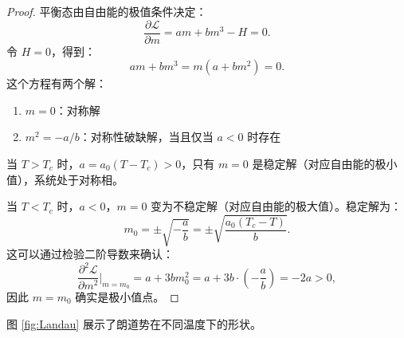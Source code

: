 \begin{proof}
平衡态由自由能的极值条件决定：
\begin{equation}
    \frac{\partial \mathcal{L}}{\partial m} = a m + b m^3 - H = 0.
\end{equation}
令 $H = 0$，得到：
\begin{equation}
    a m + b m^3 = m(a + b m^2) = 0.
\end{equation}
这个方程有两个解：
\begin{enumerate}
    \item $m = 0$：对称解
    \item $m^2 = -a/b$：对称性破缺解，当且仅当 $a < 0$ 时存在
\end{enumerate}

当 $T > T_c$ 时，$a = a_0(T - T_c) > 0$，只有 $m = 0$ 是稳定解（对应自由能的极小值），系统处于对称相。

当 $T < T_c$ 时，$a < 0$，$m = 0$ 变为不稳定解（对应自由能的极大值）。稳定解为：
\begin{equation}
    m_0 = \pm \sqrt{-\frac{a}{b}} = \pm \sqrt{\frac{a_0(T_c - T)}{b}}.
\end{equation}
这可以通过检验二阶导数来确认：
\begin{equation}
    \frac{\partial^2 \mathcal{L}}{\partial m^2}\bigg|_{m=m_0} = a + 3b m_0^2 = a + 3b \cdot \left(-\frac{a}{b}\right) = -2a > 0,
\end{equation}
因此 $m = m_0$ 确实是极小值点。
\end{proof}

图 \ref{fig:Landau} 展示了朗道势在不同温度下的形状。

